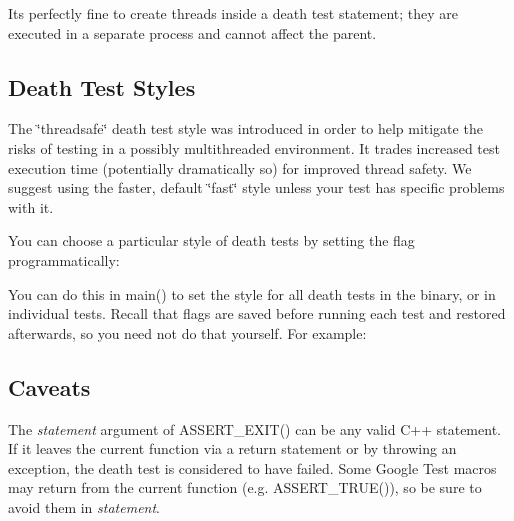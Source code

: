 It\textquotesingle{}s perfectly fine to create threads inside a death test statement; they are executed in a separate process and cannot affect the parent.

\subsection*{Death Test Styles}

The \char`\"{}threadsafe\char`\"{} death test style was introduced in order to help mitigate the risks of testing in a possibly multithreaded environment. It trades increased test execution time (potentially dramatically so) for improved thread safety. We suggest using the faster, default \char`\"{}fast\char`\"{} style unless your test has specific problems with it.

You can choose a particular style of death tests by setting the flag programmatically\+:


\begin{DoxyCode}{0}
\end{DoxyCode}


You can do this in {\ttfamily main()} to set the style for all death tests in the binary, or in individual tests. Recall that flags are saved before running each test and restored afterwards, so you need not do that yourself. For example\+:


\begin{DoxyCode}{0}
\DoxyCodeLine{\}}
\DoxyCodeLine{}
\DoxyCodeLine{\}}
\DoxyCodeLine{}
\DoxyCodeLine{\}}
\end{DoxyCode}


\subsection*{Caveats}

The {\itshape statement} argument of {\ttfamily A\+S\+S\+E\+R\+T\+\_\+\+E\+X\+I\+T()} can be any valid C++ statement. If it leaves the current function via a {\ttfamily return} statement or by throwing an exception, the death test is considered to have failed. Some Google Test macros may return from the current function (e.\+g. {\ttfamily A\+S\+S\+E\+R\+T\+\_\+\+T\+R\+U\+E()}), so be sure to avoid them in {\itshape statement}.

